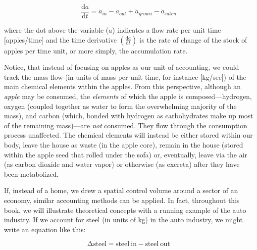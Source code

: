 \begin{equation} \label{eq:apple_rate_accounting}
	\frac{\mathrm{d}a}{\mathrm{d}t}
	= \dot{a}_{in}
	- \dot{a}_{out}
	+ \dot{a}_{grown}
	- \dot{a}_{eaten}
\end{equation}

\noindent{}where the dot above the variable ($\dot{a}$) indicates 
a flow rate per unit time [apples/time] and
the time derivative $\left( \frac{\mathrm{d}a}{\mathrm{d}t} \right)$ 
is the rate of change of the stock of apples per time unit, or more simply,
the accumulation rate.
 

Notice, that instead of focusing on apples as our unit of accounting, 
we could track the mass flow 
(in units of mass per unit time,
for instance  [kg/sec]) 
of the main chemical elements within the apples. 
From this perspective, 
although an \emph{apple} may be consumed,
the \emph{elements} of which the apple is 
composed---hydrogen, oxygen (coupled together as water
to form the overwhelming majority of the mass), 
and carbon (which, bonded with hydrogen as carbohydrates make up most 
of the remaining mass)---are \emph{not} consumed. 
They flow through the consumption process unaffected.
The chemical elements will instead be either stored within our body, 
leave the house as waste (in the apple core), 
remain in the house (stored within the apple seed 
that rolled under the sofa)
or, eventually, leave via the air (as carbon dioxide
and water vapor) or otherwise (as excreta) after they have
been metabolized.


If, instead of a home, we drew a spatial control volume 
around a sector of an economy, 
similar accounting methods can be applied. 
In fact, throughout this book, we will illustrate theoretical concepts with
a running example of the auto industry. 
If we account for steel (in units of kg) in the auto industry, 
we might write an equation like this:

\begin{equation}
	\mathrm{\Delta}\mathrm{steel} 
	= \mathrm{steel~in} 
	- \mathrm{steel~out} 
\end{equation}

